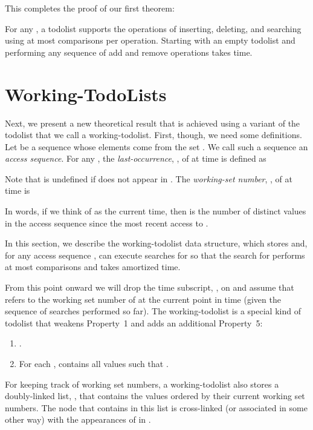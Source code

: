 \documentclass{patmorin}
\begin{document}
This completes the proof of our first theorem:
\begin{thm}
For any , a todolist supports the operations of inserting,
deleting, and searching using at most  comparisons
per operation.  Starting with an empty todolist and performing any
sequence of  add and remove operations takes  time.
\end{thm}


\section{Working-TodoLists}

Next, we present a new theoretical result that is achieved using a
variant of the todolist that we call a working-todolist.  First, though, we need
some definitions.  Let  be a sequence whose elements come
from the set .  We call such a sequence an \emph{access
sequence}. For any , the \emph{last-occurrence},
, of  at time  is defined as

Note that  is undefined if  does not appear in
.  The \emph{working-set number}, , of 
at time  is

In words, if we think of  as the current time, then  is the
number of distinct values in the access sequence since the most recent
access to .

In this section, we describe the working-todolist data structure, which
stores  and, for any access sequence ,
can execute searches for  so that the search for 
performs at most  comparisons and takes
 amortized time.

From this point onward we will drop the time subscript, , on 
and assume that  refers to the working set number of  at the
current point in time (given the sequence of searches performed so far).
The working-todolist is a special kind of todolist that weakens Property~1
and adds an additional Property~5:

\begin{enumerate}
\item .
\setcounter{enumi}{4}
\item For each ,  contains all values  such that .
\end{enumerate}

For keeping track of working set numbers, a working-todolist also stores a
doubly-linked list, , that contains the values 
ordered by their current working set numbers.  The node that contains 
in this list is cross-linked (or associated in some other way) with the
appearances of  in .
\end{document}
